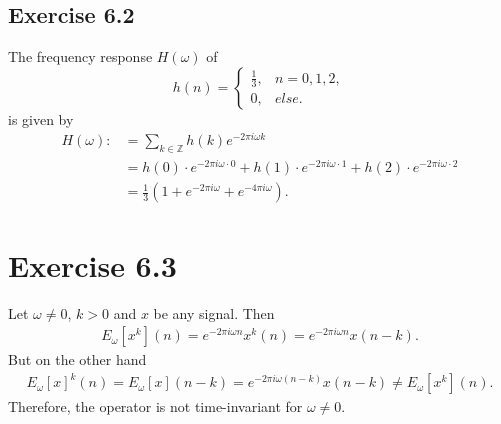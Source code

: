 \documentclass[12pt]{article}
\begin{document}
\begin{itemize}
\section*{Exercise 6.2}
The frequency response $H(\omega)$ of
\[ h(n) = \begin{cases}
            \frac{1}{3}, &n=0,1,2,\\
            0, &else.
          \end{cases} \]
is given by
\begin{align*}
    H(\omega):&=\sum_{k\in\mathbb{Z}}h(k)e^{-2\pi i \omega k}\\
    &=h(0)\cdot e^{-2\pi i \omega \cdot 0} + h(1)\cdot e^{-2\pi i \omega\cdot 1} + h(2)\cdot e^{-2\pi i \omega \cdot 2}\\
    &=\frac{1}{3}\left(1+e^{-2\pi i \omega}+e^{-4\pi i \omega}\right).
\end{align*}
    
\end{itemize}


\section*{Exercise 6.3}
Let $\omega \neq 0$, $k > 0$ and $x$ be any signal. Then
\begin{align*}
E_{\omega}\left[x^{k} \right](n) = e^{-2\pi i\omega n}x^{k}(n) = e^{-2\pi i\omega n} x(n-k).
\end{align*}
But on the other hand
\begin{align*}
E_{\omega}\left[x \right]^{k}(n) = E_{\omega}[x](n-k) = e^{-2\pi i \omega(n-k)}x(n-k) \neq E_{\omega}\left[x^{k} \right](n).
\end{align*}
Therefore, the operator is not time-invariant for $\omega \neq 0$.
\end{document}
